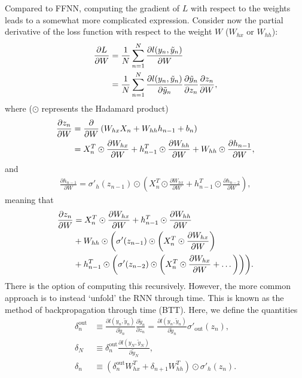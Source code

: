 \documentclass[%
reprint,
amsmath,amssymb,
aps,
]{revtex4-2}
\begin{document}
Compared to FFNN, computing the gradient of \(L\) with respect to the weights leads to a somewhat more complicated expression. Consider now the partial derivative of the loss function with respect to the weight \(W\) (\(W_{hx}\) or \(W_{hh}\)):
\begin{align}
	\frac{\partial L}{\partial W} &= \frac{1}{N}\sum\limits_{n=1}^{N}\frac{\partial l(y_n, \tilde{y}_n)}{\partial W} \notag\\
	&=\frac{1}{N}\sum\limits_{n=1}^{N}\frac{\partial l(y_n, \tilde{y}_n)}{\partial \tilde{y}_n} \frac{\partial \tilde{y}_n}{\partial z_n} \frac{\partial z_n}{\partial W},
\end{align}
where (\(\odot\) represents the Hadamard product)
\begin{align}
	\frac{\partial z_n}{\partial W} &= \frac{\partial}{\partial W}\left( W_{hx}X_n + W_{hh}h_{n-1} + b_{n} \right) \notag \\
	&= X_{n}^{T} \odot \frac{\partial W_{hx}}{\partial W} + h_{n-1}^{T} \odot \frac{\partial W_{hh}}{\partial W} + W_{hh} \odot \frac{\partial h_{n-1}}{\partial W},
\end{align}
and 
\begin{align}
	\frac{\partial h_{n-1}}{\partial W} = \sigma'_{h}(z_{n-1}) \odot \left( X^{T}_{n} \odot \frac{\partial W_{hx}}{\partial W} + h_{n-1}^{T}\odot \frac{\partial h_{n-2}}{\partial W}\right),
\end{align}
meaning that 
\begin{align}
	\frac{\partial z_{n}}{\partial W} &= X^{T}_{n} \odot \frac{\partial W_{hx}}{\partial W} + h^{T}_{n-1} \odot \frac{\partial W_{hh}}{\partial W} \notag\\
	&+ W_{hh} \odot \biggl( \sigma'(z_{n-1}) \odot \biggl(X^{T}_{n} \odot \frac{\partial W_{hx}}{\partial W}\biggr) \notag\\
	&+ h^{T}_{n-1}\odot \left(\sigma'(z_{n-2}) \odot \left(X^{T}_{n} \odot \frac{\partial W_{hx}}{\partial W} + \dots \right) \right)  \biggr).
\end{align}
There is the option of computing this recursively. However, the more common approach is to instead `unfold' the RNN through time. This is known as the method of backpropagation through time (BTT). Here, we define the quantities
\begin{subequations}
\begin{align} \label{eq:delta_definition_RNN}
	\delta^{\text{out}}_{n} &\equiv \frac{\partial l(y_n, \tilde{y}_n)}{\partial \tilde{y}_n} \frac{\partial \tilde{y}_n}{\partial z_n} = \frac{\partial l(y_n, \tilde{y}_n)}{\partial \tilde{y}_n} \sigma'_{\text{out}}(z_n), \\
	\delta_{N} &\equiv \delta^{\text{out}}_{n} \frac{\partial l(y_N, \tilde{y}_N)}{\partial \tilde{y}_N}, \\
	\delta_{n} &\equiv \left( \delta^{\text{out}}_{n} W^{T}_{hx} + \delta_{n+1}W_{hh}^T\right)\odot \sigma'_{h}(z_n).
\end{align}
\end{subequations}
\end{document}
